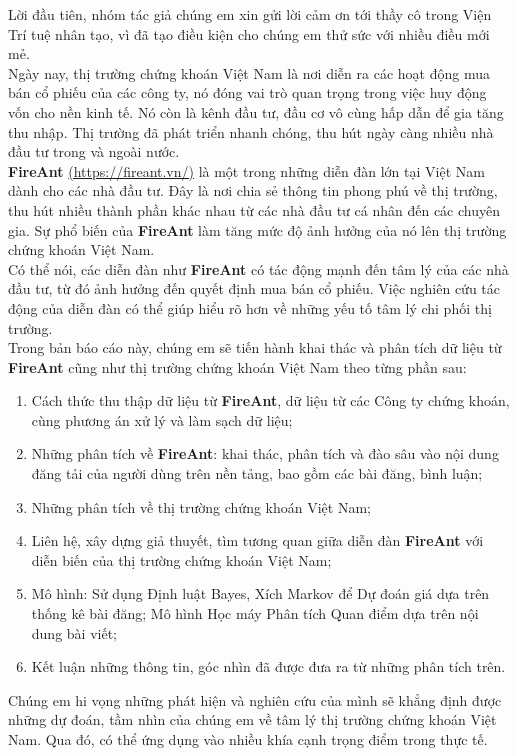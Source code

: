 \large{
Lời đầu tiên, nhóm tác giả chúng em xin gửi lời cảm ơn tới thầy cô trong Viện Trí tuệ nhân tạo, vì đã tạo điều kiện cho chúng em thử sức với nhiều điều mới mẻ. \\

Ngày nay, thị trường chứng khoán Việt Nam là nơi diễn ra các hoạt động mua bán cổ phiếu của các công ty, nó đóng vai trò quan trọng trong việc huy động vốn cho nền kinh tế. Nó còn là kênh đầu tư, đầu cơ vô cùng hấp dẫn để gia tăng thu nhập. Thị trường đã phát triển nhanh chóng, thu hút ngày càng nhiều nhà đầu tư trong và ngoài nước.\\

\textbf{FireAnt} \href{https://fireant.vn/}{(https://fireant.vn/)} là một trong những diễn đàn lớn tại Việt Nam dành cho các nhà đầu tư. Đây là nơi chia sẻ thông tin phong phú về thị trường, thu hút nhiều thành phần khác nhau từ các nhà đầu tư cá nhân đến các chuyên gia. Sự phổ biến của \textbf{FireAnt} làm tăng mức độ ảnh hưởng của nó lên thị trường chứng khoán Việt Nam.\\

Có thể nói, các diễn đàn như \textbf{FireAnt} có tác động mạnh đến tâm lý của các nhà đầu tư, từ đó ảnh hưởng đến quyết định mua bán cổ phiếu. Việc nghiên cứu tác động của diễn đàn có thể giúp hiểu rõ hơn về những yếu tố tâm lý chi phối thị trường.\\

Trong bản báo cáo này, chúng em sẽ tiến hành khai thác và phân tích dữ liệu từ \textbf{FireAnt} cũng như thị trường chứng khoán Việt Nam theo từng phần sau:
\begin{enumerate}
    \item Cách thức thu thập dữ liệu từ \textbf{FireAnt}, dữ liệu từ các Công ty chứng khoán, cùng phương án xử lý và làm sạch dữ liệu;
    \item Những phân tích về \textbf{FireAnt}: khai thác, phân tích và đào sâu vào nội dung đăng tải của người dùng trên nền tảng, bao gồm các bài đăng, bình luận;
    \item Những phân tích về thị trường chứng khoán Việt Nam;
    \item Liên hệ, xây dựng giả thuyết, tìm tương quan giữa diễn đàn \textbf{FireAnt} với diễn biến của thị trường chứng khoán Việt Nam;
    \item Mô hình: Sử dụng Định luật Bayes, Xích Markov để Dự đoán giá dựa trên thống kê bài đăng; Mô hình Học máy Phân tích Quan điểm dựa trên nội dung bài viết;
    \item Kết luận những thông tin, góc nhìn đã được đưa ra từ những phân tích trên.\\
\end{enumerate}

Chúng em hi vọng những phát hiện và nghiên cứu của mình sẽ khẳng định được những dự đoán, tầm nhìn của chúng em về tâm lý thị trường chứng khoán Việt Nam. Qua đó, có thể ứng dụng vào nhiều khía cạnh trọng điểm trong thực tế.
}
\normalsize
